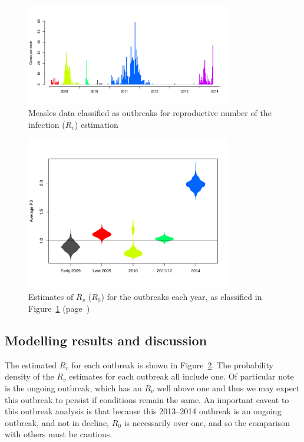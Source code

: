 \documentclass{article}
\begin{document}
{\begin{figure}
     \centering
     \includegraphics[width=0.8\textwidth]{outbreaks_for_R0.pdf}
     \caption{Measles data classified as outbreaks for reproductive number of the infection ($R_v$) estimation}
     \label{fig:outbreaks}
\end{figure}

\begin{figure}
     \centering
     \includegraphics[width=0.8\textwidth]{averageR0.pdf}
     \caption{Estimates of $R_v$ ($R_0$) for the outbreaks each year, as classified in Figure~\ref{fig:outbreaks} (page~\pageref{fig:outbreaks})}
     \label{fig:r0}
\end{figure}

\subsection{Modelling results and discussion}

The estimated $R_v$ for each outbreak is shown in Figure~\ref{fig:r0}. The probability density of the $R_v$ estimates for each outbreak all include one. Of particular note is the ongoing outbreak, which has an $R_v$ well above one and thus we may expect this outbreak to persist if conditions remain the same. An important caveat to this outbreak analysis is that because this 2013--2014 outbreak is an ongoing outbreak, and not in decline, $R_0$ is necessarily over one, and so the comparison with others must be cautious.

}
\end{document}
